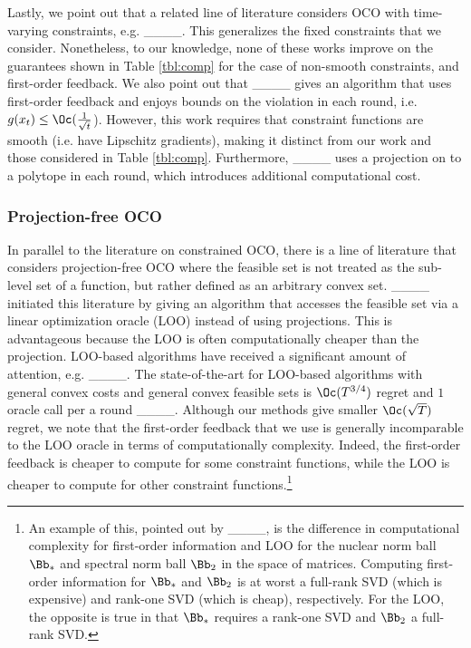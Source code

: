 Lastly, we point out that a related line of literature considers OCO with time-varying constraints, e.g. ____.
This generalizes the fixed constraints that we consider.
Nonetheless, to our knowledge, none of these works improve on the guarantees shown in Table \ref{tbl:comp} for the case of non-smooth constraints, and first-order feedback.
We also point out that ____ gives an algorithm that uses first-order feedback and enjoys bounds on the violation in each round, i.e. $g(x_t) \leq \Oc(\frac{1}{\sqrt{t}}$).
However, this work requires that constraint functions are smooth (i.e. have Lipschitz gradients), making it distinct from our work and those considered in Table \ref{tbl:comp}.
Furthermore, ____ uses a projection on to a polytope in each round, which introduces additional computational cost.

\subsubsection{Projection-free OCO}

In parallel to the literature on constrained OCO, there is a line of literature that considers projection-free OCO where the feasible set is not treated as the sub-level set of a function, but rather defined as an arbitrary convex set.
____ initiated this literature by giving an algorithm that accesses the feasible set via a linear optimization oracle (LOO) instead of using projections.
This is advantageous because the LOO is often computationally cheaper than the projection.
LOO-based algorithms have received a significant amount of attention, e.g. ____.
The state-of-the-art for LOO-based algorithms with general convex costs and general convex feasible sets is $\Oc(T^{3/4})$ regret and $1$ oracle call per a round ____.
Although our methods give smaller $\Oc(\sqrt{T})$ regret, we note that the first-order feedback that we use is generally incomparable to the LOO oracle in terms of computationally complexity.
Indeed, the first-order feedback is cheaper to compute for some constraint functions, while the LOO is cheaper to compute for other constraint functions.\footnote{An example of this, pointed out by ____, is the difference in computational complexity for first-order information and LOO for the nuclear norm ball $\Bb_*$ and spectral norm ball $\Bb_2$ in the space of matrices. Computing first-order information for $\Bb_*$ and $\Bb_2$ is at worst a full-rank SVD (which is expensive) and rank-one SVD (which is cheap), respectively. For the LOO, the opposite is true in that $\Bb_*$ requires a rank-one SVD and $\Bb_2$ a full-rank SVD.}

